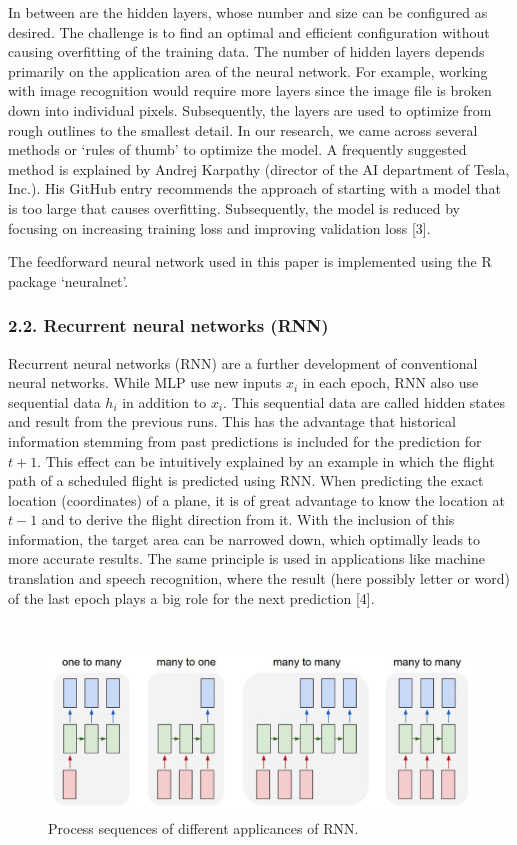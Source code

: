 \documentclass[
]{article}
\begin{document}
In between are the hidden layers, whose number and size can be
configured as desired. The challenge is to find an optimal and efficient
configuration without causing overfitting of the training data. The
number of hidden layers depends primarily on the application area of the
neural network. For example, working with image recognition would
require more layers since the image file is broken down into individual
pixels. Subsequently, the layers are used to optimize from rough
outlines to the smallest detail. In our research, we came across several
methods or `rules of thumb' to optimize the model. A frequently
suggested method is explained by Andrej Karpathy (director of the AI
department of Tesla, Inc.). His GitHub entry recommends the approach of
starting with a model that is too large that causes overfitting.
Subsequently, the model is reduced by focusing on increasing training
loss and improving validation loss {[}3{]}.

The feedforward neural network used in this paper is implemented using
the R package `neuralnet'.

\hypertarget{RNN}{%
\subsubsection{2.2. Recurrent neural networks (RNN)}\label{RNN}}

Recurrent neural networks (RNN) are a further development of
conventional neural networks. While MLP use new inputs \(x_i\) in each
epoch, RNN also use sequential data \(h_i\) in addition to \(x_i\). This
sequential data are called hidden states and result from the previous
runs. This has the advantage that historical information stemming from
past predictions is included for the prediction for \(t+1\). This effect
can be intuitively explained by an example in which the flight path of a
scheduled flight is predicted using RNN. When predicting the exact
location (coordinates) of a plane, it is of great advantage to know the
location at \(t-1\) and to derive the flight direction from it. With the
inclusion of this information, the target area can be narrowed down,
which optimally leads to more accurate results. The same principle is
used in applications like machine translation and speech recognition,
where the result (here possibly letter or word) of the last epoch plays
a big role for the next prediction {[}4{]}.

~

\begin{figure}

{\centering \includegraphics[width=0.8\linewidth]{images/RNN} 

}

\caption{Process sequences of different applicances of RNN.}\label{fig:RNN}
\end{figure}
\end{document}
